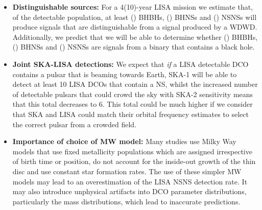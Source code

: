 \begin{itemize}
    \item \textbf{Distinguishable sources:} For a 4(10)-year LISA mission we estimate that, of the detectable population, at least \BHBHNotWDWDFour{}(\BHBHNotWDWDTen{}) BHBHs, \BHNSNotWDWDFour{}(\BHNSNotWDWDTen{}) BHNSs and \NSNSNotWDWDFour{}(\NSNSNotWDWDTen{}) NSNSs will produce signals that are distinguishable from a signal produced by a WDWD. Additionally, we predict that we will be able to determine whether \BHBHEitherBHOrNSFour{}(\BHBHEitherBHOrNSTen{}) BHBHs, \BHNSEitherBHOrNSFour{}(\BHNSEitherBHOrNSTen{}) BHNSs and \NSNSEitherBHOrNSFour{}(\NSNSEitherBHOrNSTen{}) NSNSs are signals from a binary that contains a black hole.
    \item \textbf{Joint SKA-LISA detections:} We expect that \textit{if} a LISA detectable DCO contains a pulsar that is beaming towards Earth, SKA-1 will be able to detect at least 10 LISA DCOs that contain a NS, whilst the increased number of detectable pulsars that could crowd the sky with SKA-2 sensitivity means that this total decreases to 6. This total could be much higher if we consider that SKA and LISA could match their orbital frequency estimates to select the correct pulsar from a crowded field.
    \item \textbf{Importance of choice of MW model:} Many studies use Milky Way models that use fixed metallicity populations which are assigned irrespective of birth time or position, do not account for the inside-out growth of the thin disc and use constant star formation rates. The use of these simpler MW models may lead to an overestimation of the LISA NSNS detection rate. It may also introduce unphysical artifacts into DCO parameter distributions, particularly the mass distributions, which lead to inaccurate predictions.
\end{itemize}